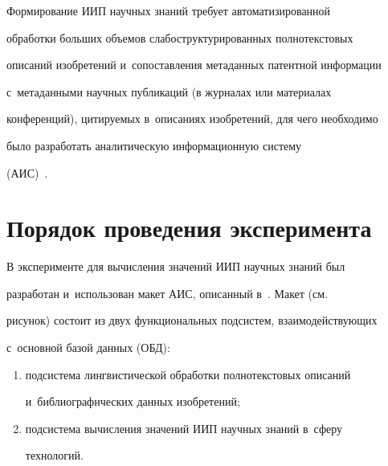      


     Формирование ИИП научных знаний требует автоматизированной 


обработки больших объемов слабоструктурированных полнотекстовых 


описаний изобретений и~сопоставления метаданных патентной информации 


с~метаданными научных публикаций (в журналах или материалах 


конференций), цитируемых в~описаниях изобретений, для чего необходимо 


было разработать аналитическую информационную систему  


(АИС)~\cite{20-mm}.





\vspace*{-4pt}


     


\section{Порядок проведения эксперимента}





\vspace*{-2pt}


     


     В эксперименте для вычисления значений ИИП научных знаний был 


разработан и~использован макет АИС, описанный в~\cite{20-mm}. Макет (см.\ 


рисунок) состоит из двух функциональных подсистем, взаимодействующих 


с~основной базой данных (ОБД):


     \begin{enumerate}[(1)]


\item подсистема лингвистической обработки полнотекстовых описаний 


и~библиографических данных изобретений;


\item подсистема вычисления значений ИИП научных знаний в~сферу 


технологий.


\end{enumerate}





